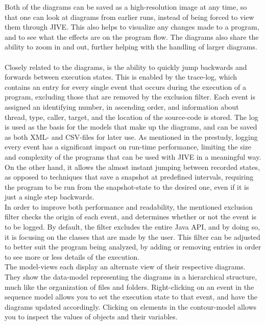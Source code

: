 Both of the diagrams can be saved as a high-resolution image at any time, so that one can look at diagrams from earlier runs, instead of being forced to view them through JIVE.
This also helps to visualize any changes made to a program, and to see what the effects are on the program flow.
The diagrams also share the ability to zoom in and out, further helping with the handling of larger diagrams.
~\\

Closely related to the diagrams, is the ability to quickly jump backwards and forwards between execution states.
This is enabled by the trace-log, which contains an entry for every single event that occurs during the execution of a program, excluding those that are removed by the exclusion filter.
Each event is assigned an identifying number, in ascending order, and information about thread, type, caller, target, and the location of the source-code is stored.
The log is used as the basis for the models that make up the diagrams, and can be saved as both XML- and CSV-files for later use.
As mentioned in the prestudy, logging every event has a significant impact on run-time performance, limiting the size and complexity of the programs that can be used with JIVE in a meaningful way.
On the other hand, it allows the almost instant jumping between recorded states, as opposed to techniques that save a snapshot at predefined intervals, requiring the program to be run from the snapshot-state to the desired one, even if it is just a single step backwards.
~\\

In order to improve both performance and readability, the mentioned exclusion filter checks the origin of each event, and determines whether or not the event is to be logged.
By default, the filter excludes the entire Java API, and by doing so, it is focusing on the classes that are made by the user.
This filter can be adjusted to better suit the program being analyzed, by adding or removing entries in order to see more or less details of the execution.
~\\

The model-views each display an alternate view of their respective diagrams.%
They show the data-model representing the diagrams in a hierarchical structure, much like the organization of files and folders.
Right-clicking on an event in the sequence model allows you to set the execution state to that event, and have the diagrams updated accordingly.
Clicking on elements in the contour-model allows you to inspect the values of objects and their variables.
~\\

